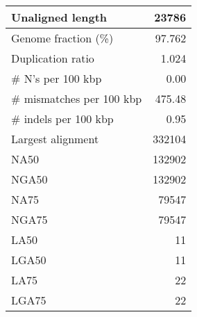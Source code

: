 \documentclass[12pt,a4paper]{article}
\begin{document}
\begin{table}[ht]
\begin{center}
\begin{tabular}{|l*{1}{|r}|}
Unaligned length & 23786 \\ \hline
Genome fraction (\%) & 97.762 \\ \hline
Duplication ratio & 1.024 \\ \hline
\# N's per 100 kbp & 0.00 \\ \hline
\# mismatches per 100 kbp & 475.48 \\ \hline
\# indels per 100 kbp & 0.95 \\ \hline
Largest alignment & 332104 \\ \hline
NA50 & 132902 \\ \hline
NGA50 & 132902 \\ \hline
NA75 & 79547 \\ \hline
NGA75 & 79547 \\ \hline
LA50 & 11 \\ \hline
LGA50 & 11 \\ \hline
LA75 & 22 \\ \hline
LGA75 & 22 \\ \hline
\end{tabular}
\end{center}
\end{table}
\end{document}

